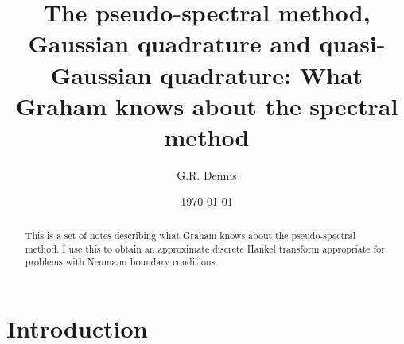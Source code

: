 \documentclass[aip,amsmath,amssymb,reprint,twocolumn]{revtex4-1}
\begin{document}

\title{The pseudo-spectral method, Gaussian quadrature and quasi-Gaussian quadrature: What Graham knows about the spectral method} %



\author{G.R. Dennis}



\date{\today}

\begin{abstract}
This is a set of notes describing what Graham knows about the pseudo-spectral method.  I use this to obtain an approximate discrete Hankel transform appropriate for problems with Neumann boundary conditions.

\end{abstract}

\pacs{}%

\maketitle %

\section{Introduction}
\label{sec:Introduction}
\end{document}
